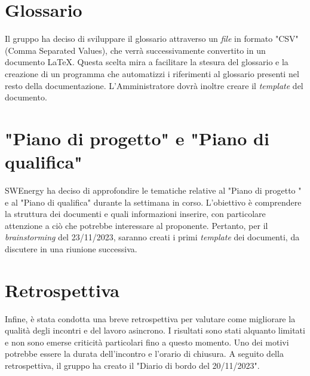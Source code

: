 \section{Glossario}

Il gruppo ha deciso di sviluppare il glossario attraverso un \textit{file} in
formato "CSV" (Comma Separated Values), che verrà successivamente convertito
in un documento \LaTeX{}. Questa scelta mira a facilitare la stesura del
glossario e la creazione di un programma che automatizzi i riferimenti al
glossario presenti nel resto della documentazione. L'Amministratore dovrà
inoltre creare il \textit{template} del documento.

\section{"Piano di progetto" e "Piano di qualifica"}

SWEnergy ha deciso di approfondire le tematiche relative al "Piano di progetto
" e al "Piano di qualifica" durante la settimana in corso. L'obiettivo è
comprendere la struttura dei documenti e quali informazioni inserire, con
particolare attenzione a ciò che potrebbe interessare al proponente. Pertanto,
per il \textit{brainstorming} del 23/11/2023, saranno creati i primi \textit{
	template} dei documenti, da discutere in una riunione successiva.

\section{Retrospettiva}

Infine, è stata condotta una breve retrospettiva per valutare come migliorare
la qualità degli incontri e del lavoro asincrono. I risultati sono stati
alquanto limitati e non sono emerse criticità particolari fino a questo momento.
Uno dei motivi potrebbe essere la durata dell'incontro e l'orario di chiusura.
A seguito della retrospettiva, il gruppo ha creato il "Diario di bordo del
20/11/2023".
